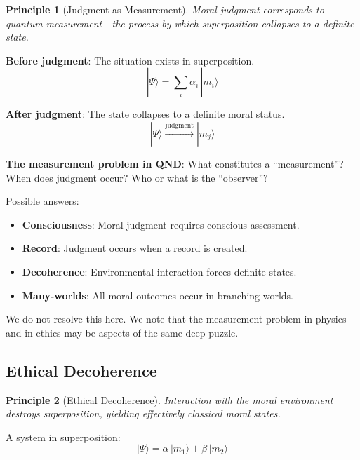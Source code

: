 \documentclass[12pt]{article}
\newtheorem{principle}{Principle}
\begin{document}
\begin{principle}[Judgment as Measurement]
\emph{Moral judgment corresponds to quantum measurement---the process by which superposition collapses to a definite state.}
\end{principle}

\textbf{Before judgment}: The situation exists in superposition.
\begin{equation}
    |\Psi\rangle = \sum_i \alpha_i \,|m_i\rangle
\end{equation}

\textbf{After judgment}: The state collapses to a definite moral status.
\begin{equation}
    |\Psi\rangle \xrightarrow{\text{judgment}} |m_j\rangle
\end{equation}

\textbf{The measurement problem in QND}: What constitutes a ``measurement''? When does judgment occur? Who or what is the ``observer''?

Possible answers:
\begin{itemize}
    \item \textbf{Consciousness}: Moral judgment requires conscious assessment.
    \item \textbf{Record}: Judgment occurs when a record is created.
    \item \textbf{Decoherence}: Environmental interaction forces definite states.
    \item \textbf{Many-worlds}: All moral outcomes occur in branching worlds.
\end{itemize}

We do not resolve this here. We note that the measurement problem in physics and in ethics may be aspects of the same deep puzzle.

\subsection{Ethical Decoherence}

\begin{principle}[Ethical Decoherence]
\emph{Interaction with the moral environment destroys superposition, yielding effectively classical moral states.}
\end{principle}

A system in superposition:
\begin{equation}
    |\Psi\rangle = \alpha \,|m_1\rangle + \beta \,|m_2\rangle
\end{equation}
\end{document}
